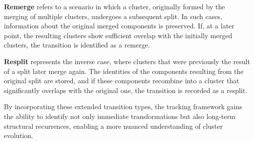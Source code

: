 \textbf{Remerge} refers to a scenario in which a cluster, originally formed by
the merging of multiple clusters, undergoes a subsequent split. In such cases,
information about the original merged components is preserved. If, at a later point,
the resulting clusters show sufficient overlap with the initially merged clusters,
the transition is identified as a remerge.

\textbf{Resplit} represents the inverse case, where clusters that were previously
the result of a split later merge again. The identities of the components resulting
from the original split are stored, and if these components recombine into a cluster
that significantly overlaps with the original one, the transition is recorded as a
resplit.

By incorporating these extended transition types, the tracking framework gains
the ability to identify not only immediate transformations but also long-term
structural recurrences, enabling a more nuanced understanding of cluster
evolution.

